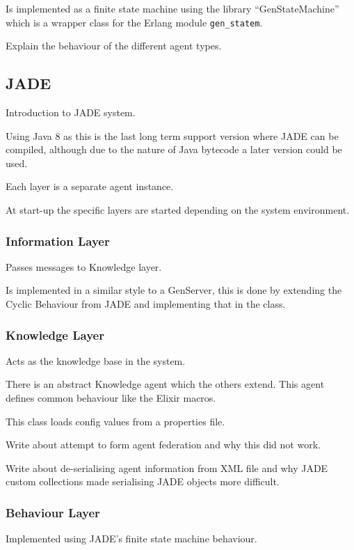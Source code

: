 Is implemented as a finite state machine using the library ``GenStateMachine'' which is a wrapper class for the Erlang module \verb|gen_statem|.

Explain the behaviour of the different agent types.

\subsection{JADE}

Introduction to JADE system.

Using Java 8 as this is the last long term support version where JADE can be compiled, although due to the nature of Java bytecode a later version could be used.

Each layer is a separate agent instance.

At start-up the specific layers are started depending on the system environment.

\subsubsection{Information Layer}

Passes messages to Knowledge layer.

Is implemented in a similar style to a GenServer, this is done by extending the Cyclic Behaviour from JADE and implementing that in the class.

\subsubsection{Knowledge Layer}

Acts as the knowledge base in the system.

There is an abstract Knowledge agent which the others extend.
This agent defines common behaviour like the Elixir macros.

This class loads config values from a properties file.

Write about attempt to form agent federation and why this did not work.

Write about de-serialising agent information from XML file and why JADE custom collections made serialising JADE objects more difficult.

\subsubsection{Behaviour Layer}

Implemented using JADE's finite state machine behaviour.

